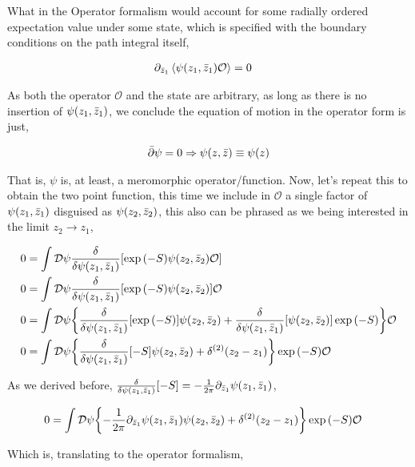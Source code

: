What in the Operator formalism would account for some radially ordered expectation value under some state, which is specified with the boundary conditions on the path integral itself, 

\begin{align*}
    \partial_{{\bar z}_1}\expval{\psi\qty(z_1,{\bar z}_1)\mathcal O}&=0
\end{align*}

As both the operator $\mathcal O$ and the state are arbitrary, as long as there is no insertion of $\psi\qty(z_1,{\bar z}_1)$, we conclude the 
equation of motion in the operator form is just,

\begin{align*}
    \bar\partial\psi=0\Rightarrow \psi\qty(z,\bar z)\equiv\psi\qty(z)
\end{align*}

That is, $\psi$ is, at least, a meromorphic operator/function. Now, let's repeat this to obtain the two point function, this time we include in 
$\mathcal O$ a single factor of $\psi\qty(z_1,{\bar z}_1)$ disguised as $\psi\qty(z_2,{\bar z}_2)$, this also can be phrased as we being interested 
in the limit $z_2\rightarrow z_1$,

\begin{align*}
    0&=\int\mathcal D\psi\fdv{}{\psi\qty(z_1,\bar z_1)}\qty[\exp\qty(-S)\psi\qty(z_2,{\bar z}_2)\mathcal O]\\
    0&=\int\mathcal D\psi\fdv{}{\psi\qty(z_1,\bar z_1)}\qty[\exp\qty(-S)\psi\qty(z_2,{\bar z}_2)]\mathcal O\\
    0&=\int\mathcal D\psi\qty{\fdv{}{\psi\qty(z_1,\bar z_1)}\qty[\exp\qty(-S)]\psi\qty(z_2,{\bar z}_2)+\fdv{}{\psi\qty(z_1,{\bar z}_1)}\qty[\psi\qty(z_2,{\bar z}_2)]\exp\qty(-S)}\mathcal O\\
    0&=\int\mathcal D\psi\qty{\fdv{}{\psi\qty(z_1,\bar z_1)}\qty[-S]\psi\qty(z_2,{\bar z}_2)+\delta^{\qty(2)}\qty(z_2-z_1)}\exp\qty(-S)\mathcal O
\end{align*}

As we derived before, $\fdv{}{\psi\qty(z_1,\bar z_1)}\qty[-S]=-\frac{1}{2\pi}\partial_{{\bar z}_1}\psi\qty(z_1,{\bar z}_1)$,

\begin{align*}
    0&=\int\mathcal D\psi\qty{-\frac{1}{2\pi}\partial_{{\bar z}_1}\psi\qty(z_1,{\bar z}_1)\psi\qty(z_2,{\bar z}_2)+\delta^{\qty(2)}\qty(z_2-z_1)}\exp\qty(-S)\mathcal O
\end{align*}

Which is, translating to the operator formalism,

